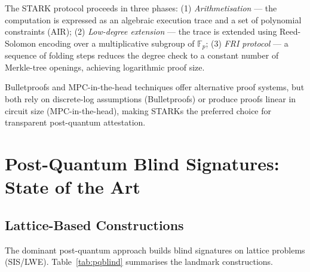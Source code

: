 \documentclass[11pt,a4paper]{article}
\newcommand{\Fp}{\mathbb{F}_p}
\begin{document}
The STARK protocol proceeds in three phases:
(1) \emph{Arithmetisation} --- the computation is expressed as an algebraic execution trace and
a set of polynomial constraints (AIR);
(2) \emph{Low-degree extension} --- the trace is extended using Reed-Solomon encoding over a
multiplicative subgroup of $\Fp$;
(3) \emph{FRI protocol} --- a sequence of folding steps reduces the degree check to a constant
number of Merkle-tree openings, achieving logarithmic proof size.

Bulletproofs \cite{Bunz2018Bulletproofs} and MPC-in-the-head techniques
\cite{Katz2018ImprovedNIZK} offer alternative proof systems, but both rely on discrete-log
assumptions (Bulletproofs) or produce proofs linear in circuit size (MPC-in-the-head),
making STARKs the preferred choice for transparent post-quantum attestation.

\section{Post-Quantum Blind Signatures: State of the Art}
\label{sec:pqblind}

\subsection{Lattice-Based Constructions}

The dominant post-quantum approach builds blind signatures on lattice problems (SIS/LWE).
Table~\ref{tab:pqblind} summarises the landmark constructions.
\end{document}
